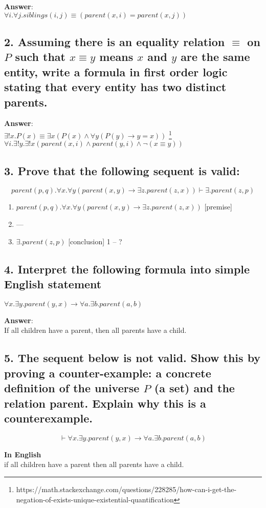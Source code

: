 \documentclass[a4paper, 14pt]{report}
\newcommand{\answer}[1]{%
	\begin{flushleft}
		\textbf{Answer}:\\
			#1
	\end{flushleft}}
\newcommand{\question}[1]{\subsection*{#1}}
\begin{document}
\answer{$ \forall{i}.\forall{j}.siblings(i, j) \equiv (parent(x, i) = parent(x, j)) $}

\question{2. Assuming there is an equality relation $ \equiv $ on $ P $ 
	such that $ x \equiv y $ means $ x $ and $ y $ are the same entity, 
  write a formula in first order logic stating that every entity has two distinct parents.} 

\answer{%
	$ \exists!{x}.P(x) \equiv \exists{x}(P(x) \wedge \forall{y}(P(y) \rightarrow y = x))  $
	\footnote{https://math.stackexchange.com/questions/228285/how-can-i-get-the-negation-of-exists-unique-existential-quantification} \\
	$ \forall{i}.\exists!{y}.\exists!{x} (parent(x, i) \wedge parent(y, i) \wedge \neg (x \equiv y)) $ 
}

\question{3. Prove that the following sequent is valid:}

\[ parent(p, q).\forall{x}.\forall{y}(parent(x, y) \rightarrow \exists{z}.parent(z,x)) \vdash \exists.parent(z, p) \]

\hline

\begin{enumerate}		
	\item $ parent(p, q).\forall{x}.\forall{y}(parent(x, y) \rightarrow \exists{z}.parent(z,x)) $ [premise]
	\item  ---
	\item $ \exists.parent(z, p) $ [conclusion] 1 -- ?
\end{enumerate}		

\hline

\question{4. Interpret the following formula into simple English statement}

$ \forall{x}.\exists{y}.parent(y, x) \rightarrow \forall{a}.\exists{b}.parent(a, b) $

\answer{If all children have a parent, then all parents have a child.}

\question{5. The sequent below is not valid. Show this by proving a 
	counter-example: a concrete definition of the universe $ P $ (a set) 
	and the relation parent. Explain why this is a counterexample.} 

\[ 
	\vdash \forall{x}.\exists{y}.parent(y, x) \rightarrow \forall{a}.\exists{b}.parent(a, b) 
\]

\begin{flushleft}
	\textbf{In English}\\
	if all children have a parent then all parents have a child.
\end{flushleft}
\end{document}
